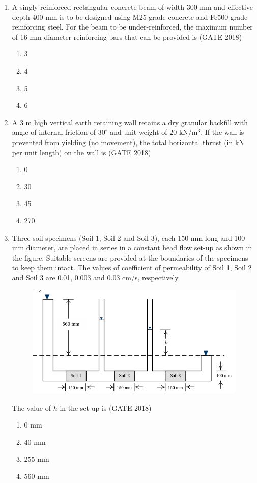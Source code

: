 \documentclass[journal,12pt,onecolumn]{IEEEtran}
\theoremstyle{remark}
\begin{document}
\begin{enumerate}
\item A singly-reinforced rectangular concrete beam of width 300 mm and effective depth 400 mm is to be designed using M25 grade concrete and Fe500 grade reinforcing steel. For the beam to be under-reinforced, the maximum number of 16 mm diameter reinforcing bars that can be provided is
\hfill{(GATE 2018)}
\begin{multicols}{4}
\begin{enumerate}
    \item 3
    \item 4
    \item 5
    \item 6
\end{enumerate}
\end{multicols}
\vspace{1cm}
\newpage
\item A 3 m high vertical earth retaining wall retains a dry granular backfill with angle of internal friction of $30^\circ$ and unit weight of $20$ kN/m$^3$. If the wall is prevented from yielding (no movement), the total horizontal thrust (in kN per unit length) on the wall is
\hfill{(GATE 2018)}
\begin{multicols}{4}
\begin{enumerate}
    \item 0
    \item 30
    \item 45
    \item 270
\end{enumerate}
\end{multicols}
\vspace{1cm}

\item Three soil specimens (Soil 1, Soil 2 and Soil 3), each 150 mm long and 100 mm diameter, are placed in series in a constant head flow set-up as shown in the figure. Suitable screens are provided at the boundaries of the specimens to keep them intact. The values of coefficient of permeability of Soil 1, Soil 2 and Soil 3 are 0.01, 0.003 and 0.03 cm/s, respectively.
\begin{figure}[h]
    \centering
    \includegraphics[width=0.5\linewidth]{GATE-CE-2018/33-2.png}
    \caption{}
    \label{33-2}
\end{figure}
The value of $h$ in the set-up is
\hfill{(GATE 2018)}
\begin{multicols}{4}
\begin{enumerate}
    \item 0 mm
    \item 40 mm
    \item 255 mm
    \item 560 mm
\end{enumerate}
\end{multicols}
\vspace{1cm}


\end{enumerate}
\end{document}

